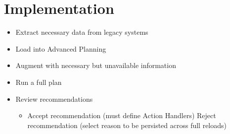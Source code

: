 \documentclass[letterpaper,10pt,english]{sphinxmanual}
\begin{document}
\chapter{Implementation}
\label{\detokenize{BusinessProcessReengineering:implementation}}\begin{itemize}
\item {} 
Extract necessary data from legacy systems

\item {} 
Load into Advanced Planning

\item {} 
Augment with necessary but unavailable information

\item {} 
Run a full plan

\item {} 
Review recommendations
\begin{itemize}
\item {} 
Accept recommendation (must define Action Handlers) Reject
recommendation (select reason to be persisted across full reloads)

\end{itemize}

\end{itemize}
\end{document}
